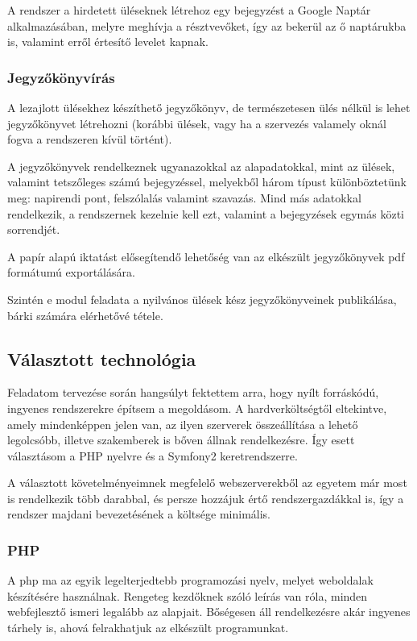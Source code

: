 \documentclass[a4paper,12pt,oneside]{report}
\begin{document}
A rendszer a hirdetett üléseknek létrehoz egy bejegyzést a Google Naptár alkalmazásában, melyre meghívja a résztvevőket, így az bekerül az ő naptárukba is, valamint erről értesítő levelet kapnak.

\subsubsection{Jegyzőkönyvírás}

A lezajlott ülésekhez készíthető jegyzőkönyv, de természetesen ülés nélkül is lehet jegyzőkönyvet létrehozni (korábbi ülések, vagy ha a szervezés valamely oknál fogva a rendszeren kívül történt).

A jegyzőkönyvek rendelkeznek ugyanazokkal az alapadatokkal, mint az ülések, valamint tetszőleges számú bejegyzéssel, melyekből három típust különböztetünk meg: napirendi pont, felszólalás valamint szavazás. Mind más adatokkal rendelkezik, a rendszernek kezelnie kell ezt, valamint a bejegyzések egymás közti sorrendjét.

A papír alapú iktatást elősegítendő lehetőség van az elkészült jegyzőkönyvek pdf formátumú exportálására.

Szintén e modul feladata a nyilvános ülések kész jegyzőkönyveinek publikálása, bárki számára elérhetővé tétele.

\subsection{Választott technológia}

Feladatom tervezése során hangsúlyt fektettem arra, hogy nyílt forráskódú, ingyenes rendszerekre építsem a megoldásom. A hardverköltségtől eltekintve, amely mindenképpen jelen van, az ilyen szerverek összeállítása a lehető legolcsóbb, illetve szakemberek is bőven állnak rendelkezésre. Így esett választásom a PHP nyelvre és a Symfony2 keretrendszerre.

A választott követelményeimnek megfelelő webszerverekből az egyetem már most is rendelkezik több darabbal, és persze hozzájuk értő rendszergazdákkal is, így a rendszer majdani bevezetésének a költsége minimális.

\subsubsection{PHP}

A php ma az egyik legelterjedtebb programozási nyelv, melyet weboldalak készítésére használnak. Rengeteg kezdőknek szóló leírás van róla, minden webfejlesztő ismeri legalább az alapjait. Bőségesen áll rendelkezésre akár ingyenes tárhely is, ahová felrakhatjuk az elkészült programunkat.
\end{document}

